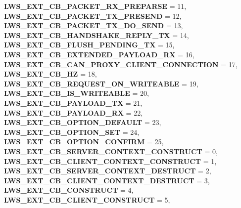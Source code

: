 \begin{DoxyCompactItemize}
{\bfseries L\+W\+S\+\_\+\+E\+X\+T\+\_\+\+C\+B\+\_\+\+P\+A\+C\+K\+E\+T\+\_\+\+R\+X\+\_\+\+P\+R\+E\+P\+A\+R\+SE} = 11, 
\newline
{\bfseries L\+W\+S\+\_\+\+E\+X\+T\+\_\+\+C\+B\+\_\+\+P\+A\+C\+K\+E\+T\+\_\+\+T\+X\+\_\+\+P\+R\+E\+S\+E\+ND} = 12, 
{\bfseries L\+W\+S\+\_\+\+E\+X\+T\+\_\+\+C\+B\+\_\+\+P\+A\+C\+K\+E\+T\+\_\+\+T\+X\+\_\+\+D\+O\+\_\+\+S\+E\+ND} = 13, 
{\bfseries L\+W\+S\+\_\+\+E\+X\+T\+\_\+\+C\+B\+\_\+\+H\+A\+N\+D\+S\+H\+A\+K\+E\+\_\+\+R\+E\+P\+L\+Y\+\_\+\+TX} = 14, 
{\bfseries L\+W\+S\+\_\+\+E\+X\+T\+\_\+\+C\+B\+\_\+\+F\+L\+U\+S\+H\+\_\+\+P\+E\+N\+D\+I\+N\+G\+\_\+\+TX} = 15, 
\newline
{\bfseries L\+W\+S\+\_\+\+E\+X\+T\+\_\+\+C\+B\+\_\+\+E\+X\+T\+E\+N\+D\+E\+D\+\_\+\+P\+A\+Y\+L\+O\+A\+D\+\_\+\+RX} = 16, 
{\bfseries L\+W\+S\+\_\+\+E\+X\+T\+\_\+\+C\+B\+\_\+\+C\+A\+N\+\_\+\+P\+R\+O\+X\+Y\+\_\+\+C\+L\+I\+E\+N\+T\+\_\+\+C\+O\+N\+N\+E\+C\+T\+I\+ON} = 17, 
{\bfseries L\+W\+S\+\_\+\+E\+X\+T\+\_\+\+C\+B\+\_\+HZ} = 18, 
{\bfseries L\+W\+S\+\_\+\+E\+X\+T\+\_\+\+C\+B\+\_\+\+R\+E\+Q\+U\+E\+S\+T\+\_\+\+O\+N\+\_\+\+W\+R\+I\+T\+E\+A\+B\+LE} = 19, 
\newline
{\bfseries L\+W\+S\+\_\+\+E\+X\+T\+\_\+\+C\+B\+\_\+\+I\+S\+\_\+\+W\+R\+I\+T\+E\+A\+B\+LE} = 20, 
{\bfseries L\+W\+S\+\_\+\+E\+X\+T\+\_\+\+C\+B\+\_\+\+P\+A\+Y\+L\+O\+A\+D\+\_\+\+TX} = 21, 
{\bfseries L\+W\+S\+\_\+\+E\+X\+T\+\_\+\+C\+B\+\_\+\+P\+A\+Y\+L\+O\+A\+D\+\_\+\+RX} = 22, 
{\bfseries L\+W\+S\+\_\+\+E\+X\+T\+\_\+\+C\+B\+\_\+\+O\+P\+T\+I\+O\+N\+\_\+\+D\+E\+F\+A\+U\+LT} = 23, 
\newline
{\bfseries L\+W\+S\+\_\+\+E\+X\+T\+\_\+\+C\+B\+\_\+\+O\+P\+T\+I\+O\+N\+\_\+\+S\+ET} = 24, 
{\bfseries L\+W\+S\+\_\+\+E\+X\+T\+\_\+\+C\+B\+\_\+\+O\+P\+T\+I\+O\+N\+\_\+\+C\+O\+N\+F\+I\+RM} = 25, 
{\bfseries L\+W\+S\+\_\+\+E\+X\+T\+\_\+\+C\+B\+\_\+\+S\+E\+R\+V\+E\+R\+\_\+\+C\+O\+N\+T\+E\+X\+T\+\_\+\+C\+O\+N\+S\+T\+R\+U\+CT} = 0, 
{\bfseries L\+W\+S\+\_\+\+E\+X\+T\+\_\+\+C\+B\+\_\+\+C\+L\+I\+E\+N\+T\+\_\+\+C\+O\+N\+T\+E\+X\+T\+\_\+\+C\+O\+N\+S\+T\+R\+U\+CT} = 1, 
\newline
{\bfseries L\+W\+S\+\_\+\+E\+X\+T\+\_\+\+C\+B\+\_\+\+S\+E\+R\+V\+E\+R\+\_\+\+C\+O\+N\+T\+E\+X\+T\+\_\+\+D\+E\+S\+T\+R\+U\+CT} = 2, 
{\bfseries L\+W\+S\+\_\+\+E\+X\+T\+\_\+\+C\+B\+\_\+\+C\+L\+I\+E\+N\+T\+\_\+\+C\+O\+N\+T\+E\+X\+T\+\_\+\+D\+E\+S\+T\+R\+U\+CT} = 3, 
{\bfseries L\+W\+S\+\_\+\+E\+X\+T\+\_\+\+C\+B\+\_\+\+C\+O\+N\+S\+T\+R\+U\+CT} = 4, 
{\bfseries L\+W\+S\+\_\+\+E\+X\+T\+\_\+\+C\+B\+\_\+\+C\+L\+I\+E\+N\+T\+\_\+\+C\+O\+N\+S\+T\+R\+U\+CT} = 5, 
\newline

\end{DoxyCompactItemize}
